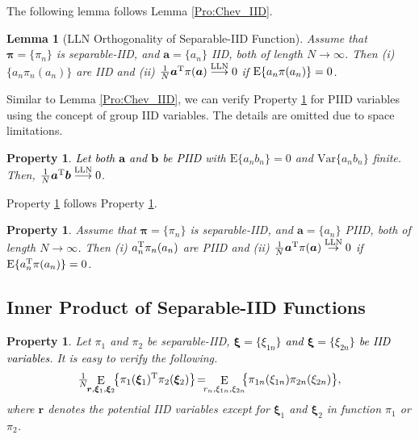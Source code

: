 \documentclass[journal]{IEEEtran}
\newcommand{\mr}{\mathrm}
\newcommand{\BE}{\begin{equation}}
\newcommand{\EE}{\end{equation}}
\renewcommand{\bf}{\bm}
\newtheorem{property}[theorem]{Property}
\newtheorem{lemma}[theorem]{Lemma}
\newcommand{\LLC}[1]{\textcolor{black}{#1}}%
\begin{document}
The following lemma follows Lemma \ref{Pro:Chev_IID}.
 
\begin{lemma}[LLN Orthogonality of Separable-IID Function]\label{Pro:LLN_F_IID}
Assume that $\bf{\pi}=\{\pi_n\}$ is separable-IID, and  $\bf{a}=\{a_n\}$ IID, both of length $N\to \infty$. Then (i) $\{a_n \pi_n(a_n)\}$ are IID and (ii) $\tfrac{1}{N}\bf{a}^{\rm T}\pi(\bf{a})\overset{\rm LLN}{\longrightarrow} 0$ if ${\rm E}\{a_n \pi(a_n)\}=0$. 
\end{lemma} 



Similar to Lemma \ref{Pro:Chev_IID}, we can verify Property \ref{Pro:PIID_LLN} for PIID  variables using the concept of group IID variables. The details are omitted due to space limitations.  %

\begin{property}\label{Pro:PIID_LLN}
 \LLC{Let both $\bf{a}$ and $\bf{b}$ be PIID} with $ \mr{E}\{a_n b_n\}=0$ and  $ \mr{Var}\{ a_n b_n\}$ finite. Then, $\tfrac{1}{N}\bf{a}^{\mr{T}}\bf{b} \overset{\rm LLN}{\longrightarrow}0$. 
\end{property}

Property \ref{Pro:LLN_F_PIID} follows Property \ref{Pro:PIID_LLN}. 

\begin{property}\label{Pro:LLN_F_PIID}
Assume that $\bf{\pi}=\{\pi_n\}$ is separable-IID, and  $\bf{a}=\{a_n\}$ PIID, both of length $N\to \infty$. Then (i) $a_n^{\rm T}\pi_n(a_n)$ are PIID and (ii) $\tfrac{1}{N}\bf{a}^{\rm T}\pi(\bf{a})\overset{\rm LLN}{\rightarrow} 0$ if ${\rm E}\{a_n^{\rm T}\pi(a_n)\}=0$. 
\end{property}



\subsection{Inner Product of Separable-IID Functions}\label{APP:In_Pro}  
 
\begin{property}\label{Pro:Exp}
  Let $\pi_1$ and $\pi_2$ be separable-IID,  \LLC{$\bf{\xi}=\{\xi_{1n}\}$ and $\bf{\xi}=\{\xi_{2n}\}$ be IID  variables}. It is easy to verify the following. 
\BE\label{Eqn:ALG-SteinLemma}
\tfrac{1}{N}\!\! \mathop\mr{E}\limits_{\bf{r},\bf{\xi}_1,\bf{\xi}_2}\!\!\big\{  \pi_1(\bf{\xi}_1)^{\rm T} \pi_2(\bf{\xi}_2)\big\} \!= \!\!\! \mathop\mr{E}\limits_{r_n,\xi_{1n},\xi_{2n}}\!\!\!\big\{ \pi_{1n}(\xi_{1n}) \pi_{2n}(\xi_{2n}) \big\},
\EE
where $\bf{r}$ denotes the potential IID variables except for $\bf{\xi}_1$ and $\bf{\xi}_2$ in function $\pi_1 $ or $\pi_2 $. 
\end{property}
  
\end{document}
